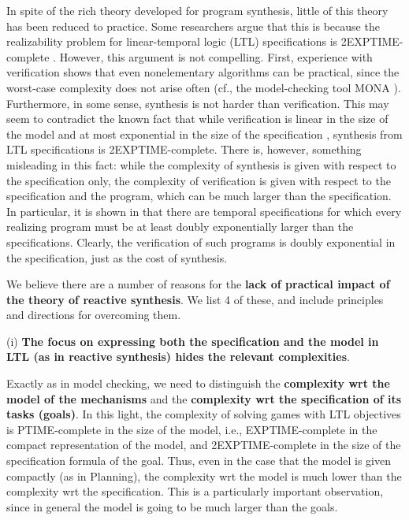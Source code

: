 In spite of the rich theory developed for program synthesis, little of
this theory has been reduced to practice. 
Some researchers argue that this is because the realizability problem
for linear-temporal logic (LTL) specifications is 2EXPTIME-complete
\cite{PnRo89,Rosner92}. However, this argument is not compelling.
First, experience with verification shows that even nonelementary
algorithms can be practical, since the worst-case complexity does not
arise often (cf., the model-checking tool MONA \cite{ElgaardKM98}).
Furthermore, in some sense, synthesis is not harder than verification.
This may seem to contradict the known fact that while verification is
linear in the size of the model and at most exponential in the size of
the specification \cite{ClarkeGP:99-ModelChecking}, synthesis from LTL
specifications is 2EXPTIME-complete. There is, however, something
misleading in this fact: while the complexity of synthesis is given
with respect to the specification only, the complexity of verification
is given with respect to the specification and the program, which can
be much larger than the specification. In particular, it is shown in
\cite{Rosner92} that there are temporal specifications for which every
realizing program must be at least doubly exponentially larger than
the specifications. Clearly, the verification of such programs is
doubly exponential in the specification, just as the cost of
synthesis.


We believe there are a number of reasons for the \textbf{lack of
practical impact of the theory of reactive synthesis}.  We list 4 of
these, and include principles and directions for overcoming them.


(i) \textbf{The focus on expressing both the specification and the
model in LTL (as in reactive synthesis) hides the relevant
complexities}.

Exactly as in model checking, we need to distinguish the
\textbf{complexity wrt the model of the mechanisms} and the
\textbf{complexity wrt the specification of its tasks (goals)}. In
this light, the complexity of solving games with LTL objectives is
PTIME-complete in the size of the model, i.e., EXPTIME-complete in the
compact representation of the model, and 2EXPTIME-complete in the size
of the specification formula of the goal. Thus, even in the case that
the model is given compactly (as in Planning), the complexity wrt the
model is much lower than the complexity wrt the specification. This is
a particularly important observation, since in general the model is
going to be much larger than the goals.

